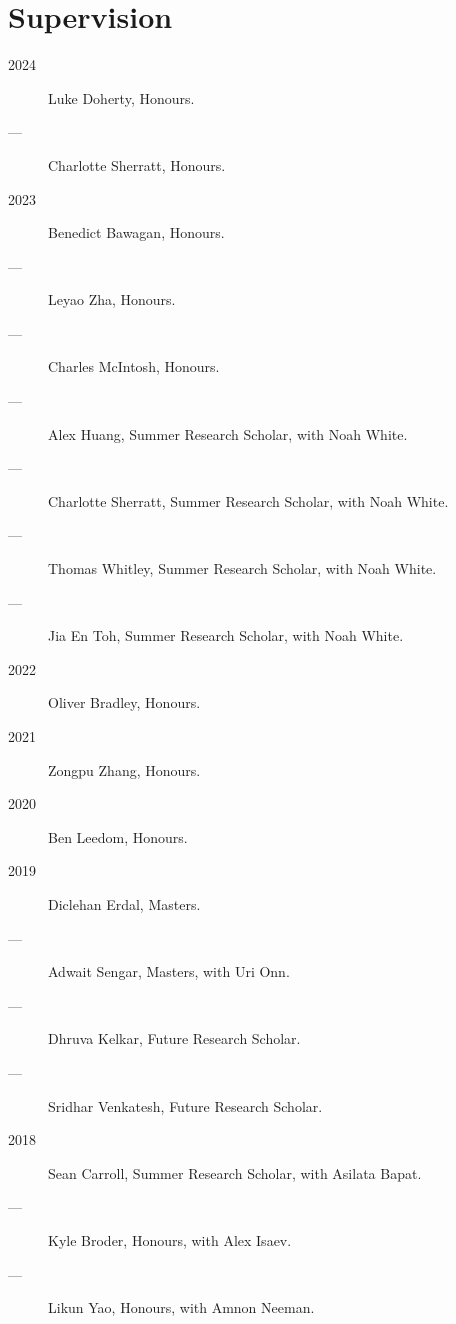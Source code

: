 \documentclass[11pt]{article}
\begin{document}
\section*{Supervision}
\label{sec:org2226514}
\label{org0419a58}
\begin{description}
\item[{2024}] Luke Doherty, Honours.
\item[{---}] Charlotte Sherratt, Honours.
\item[{2023}] Benedict Bawagan, Honours.
\item[{---}] Leyao Zha, Honours.
\item[{---}] Charles McIntosh, Honours.
\item[{---}] Alex Huang, Summer Research Scholar, with Noah White.
\item[{---}] Charlotte Sherratt, Summer Research Scholar, with Noah White.
\item[{---}] Thomas Whitley, Summer Research Scholar, with Noah White.
\item[{---}] Jia En Toh, Summer Research Scholar, with Noah White.
\item[{2022}] Oliver Bradley, Honours.
\item[{2021}] Zongpu Zhang, Honours.
\item[{2020}] Ben Leedom, Honours.
\item[{2019}] Diclehan Erdal, Masters.
\item[{---}] Adwait Sengar, Masters, with Uri Onn.
\item[{---}] Dhruva Kelkar, Future Research Scholar.
\item[{---}] Sridhar Venkatesh, Future Research Scholar.
\item[{2018}] Sean Carroll, Summer Research Scholar, with Asilata Bapat.
\item[{---}] Kyle Broder, Honours, with Alex Isaev.
\item[{---}] Likun Yao, Honours, with Amnon Neeman.
\end{description}
\end{document}
